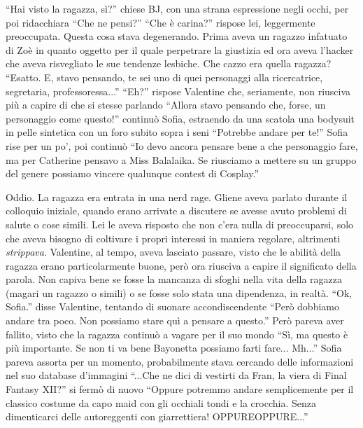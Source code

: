     ``Hai visto la ragazza, sì?'' chiese BJ, con una strana espressione negli occhi, per poi ridacchiara ``Che ne
    pensi?'' ``Che è carina?'' rispose lei, leggermente preoccupata. Questa cosa stava degenerando. Prima aveva un
    ragazzo infatuato di Zoè in quanto oggetto per il quale perpetrare la giustizia ed ora aveva l'hacker che aveva
    risvegliato le sue tendenze lesbiche. Che cazzo era quella ragazza? ``Esatto. E, stavo pensando, te sei uno di quei
    personaggi alla ricercatrice, segretaria, professoressa...'' ``Eh?'' rispose Valentine che, seriamente, non riusciva
    più a capire di che si stesse parlando ``Allora stavo pensando che, forse, un personaggio come questo!'' continuò
    Sofia, estraendo da una scatola una bodysuit in pelle sintetica con un foro subito sopra i seni ``Potrebbe andare
    per te!'' Sofia rise per un po', poi continuò ``Io devo ancora pensare bene a che personaggio fare, ma per Catherine
    pensavo a Miss Balalaika. Se riusciamo a mettere su un gruppo del genere possiamo vincere qualunque contest di
    Cosplay.''

    Oddio. La ragazza era entrata in una nerd rage. Gliene aveva parlato durante il colloquio iniziale, quando erano
    arrivate a discutere se avesse avuto problemi di salute o cose simili. Lei le aveva risposto che non c'era nulla di
    preoccuparsi, solo che aveva bisogno di coltivare i propri interessi in maniera regolare, altrimenti
    \emph{strippava}. Valentine, al tempo, aveva lasciato passare, visto che le abilità della ragazza erano
    particolarmente buone, però ora riusciva a capire il significato della parola. Non capiva bene se fosse la mancanza
    di sfoghi nella vita della ragazza (magari un ragazzo o simili) o se fosse solo stata una dipendenza, in realtà.
    ``Ok, Sofia.'' disse Valentine, tentando di suonare accondiscendente ``Però dobbiamo andare tra poco. Non possiamo
    stare quì a pensare a questo.'' Però pareva aver fallito, visto che la ragazza continuò a vagare per il suo mondo
    ``Sì, ma questo è più importante. Se non ti va bene Bayonetta possiamo farti fare... Mh...'' Sofia pareva assorta
    per un momento, probabilmente stava cercando delle informazioni nel suo database d'immagini ``...Che ne dici di
    vestirti da Fran, la viera di Final Fantasy XII?'' si fermò di nuovo ``Oppure potremmo andare semplicemente per il
    classico costume da capo maid con gli occhiali tondi e la crocchia. Senza dimenticarci delle autoreggenti con
    giarrettiera! OPPUREOPPURE...''

